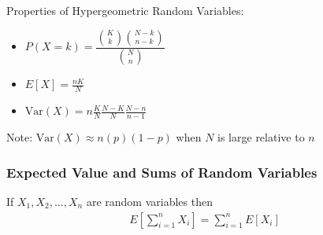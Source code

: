\documentclass[10pt]{article}
\begin{document}
			\noindent Properties of Hypergeometric Random Variables:
		\begin{multicols}{3}
			\begin{itemize}
				\item $P(X=k) = \dfrac{{K \choose k} {{N-k} \choose {n-k}}}{{N \choose n}}$
				\item $E[X] = \frac{nK}{N}$
				\item $\text{Var}(X)= n \frac{K}{N} \frac{N-K}{N} \frac{N-n}{n-1}$
			\end{itemize}
		\end{multicols}
		\noindent Note: $\text{Var}(X) \approx n(p)(1-p)$ when $N$ is large relative to $n$
		
		\subsubsection*{Expected Value and Sums of Random Variables}
		If $X_1, X_2, \ldots, X_n$ are random variables then
		\begin{align*}
			E \left[ \sum_{i=1}^{n} X_i \right] = \sum_{i=1}^{n} E[X_i]
		\end{align*}
\end{document}
